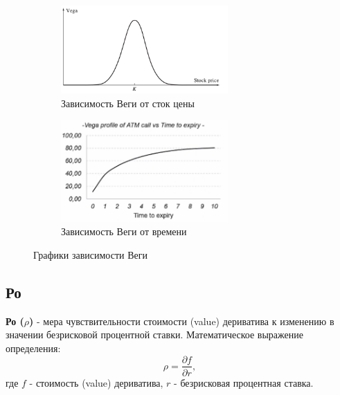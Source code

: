 \documentclass{article}
\begin{document}
\begin{itemize}
 \begin{figure}[h]
 	\centering
 	\begin{subfigure}{.49\textwidth}
 		\centering
 		\includegraphics[width=0.7\textwidth]{vega-price.jpg}
 		\caption{Зависимость Веги от сток цены}
 		\label{model}
 	\end{subfigure}
 	\begin{subfigure}{.5\textwidth}
 		\centering
 		\includegraphics[width=0.7\textwidth]{vega-time.jpg}
 		\caption{Зависимость Веги от времени}
 		\label{model}
 	\end{subfigure}
 	
 	\caption{Графики зависимости Веги}
 	\label{model}
 \end{figure}
 
  \end{itemize}
 
 
 \subsection{Ро}
 \textbf{Ро ($\rho$) } - мера чувствительности стоимости (value) дериватива к изменению в значении безрисковой процентной ставки. Математическое выражение определения: $$\rho = \dfrac{\partial f}{\partial r},$$ где $f$ - стоимость (value) дериватива, $r$ - безрисковая процентная ставка.
 
\end{document}
